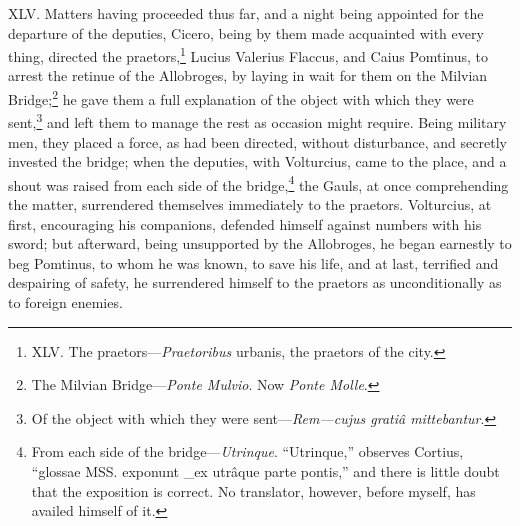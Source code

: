 XLV. Matters having proceeded thus far, and a night being appointed
for the departure of the deputies, Cicero, being by them made
acquainted with every thing, directed the praetors,\footnote{XLV. The praetors—\emph{Praetoribus} urbanis, the praetors of the city.} Lucius
Valerius Flaccus, and Caius Pomtinus, to arrest the retinue of the
Allobroges, by laying in wait for them on the Milvian Bridge;\footnote{The Milvian Bridge—\emph{Ponte Mulvio}. Now \emph{Ponte Molle}.} he
gave them a full explanation of the object with which they were
sent,\footnote{Of the object with which they were sent—\emph{Rem—cujus gratiâ
mittebantur}.} and left them to manage the rest as occasion might require.
Being military men, they placed a force, as had been directed, without
disturbance, and secretly invested the bridge; when the deputies, with
Volturcius, came to the place, and a shout was raised from each side
of the bridge,\footnote{From each side of the bridge—\emph{Utrinque}. ``Utrinque,'' observes
Cortius, ``glossae MSS. exponunt \_ex utrâque parte pontis,'' and there
is little doubt that the exposition is correct. No translator, however,
before myself, has availed himself of it.} the Gauls, at once comprehending the matter,
surrendered themselves immediately to the praetors. Volturcius, at
first, encouraging his companions, defended himself against numbers
with his sword; but afterward, being unsupported by the Allobroges, he
began earnestly to beg Pomtinus, to whom he was known, to save his
life, and at last, terrified and despairing of safety, he surrendered
himself to the praetors as unconditionally as to foreign enemies.


